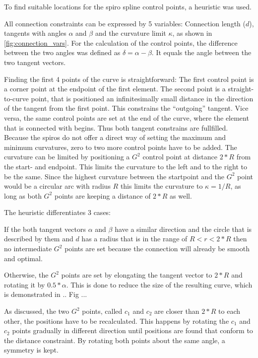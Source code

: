 To find suitable locations for the spiro spline control points, a heuristic was used.

All connection constraints can be expressed by 5 variables: Connection length ($d$), tangents with angles $\alpha$ and $\beta$ and the curvature limit $\kappa$, as shown in \autoref{fig:connection_vars}. For the calculation of the control points, the difference between the two angles was defined as $\delta = \alpha - \beta$. It equals the angle between the two tangent vectors. 

Finding the first 4 points of the curve is straightforward: The first control point is a corner point at the endpoint of the first element. The second point is a straight-to-curve point, that is positioned an infinitesimally small distance in the direction of the tangent from the first point. This constrains the \enquote{outgoing} tangent. Vice versa, the same control points are set at the end of the curve, where the element that is connected with begins. Thus both tangent constrains are fullfilled. Because the spiros do not offer a direct way of setting the maximum and minimum curvatures, zero to two more control points have to be added. The curvature can be limited by positioning a $G^2$ control point at distance $2 * R$ from the start- and endpoint. This limits the curvature to the left and to the right to be the same. Since the highest curvature between the startpoint and the $G^2$ point would be a circular arc with radius $R$ this limits the curvature to $\kappa = 1/R$, as long as both $G^2$ points are keeping a distance of $2*R$ as well.

The heuristic differentiates 3 cases:

If the both tangent vectors $\alpha$ and $\beta$ have a similar direction and the circle that is described by them and $d$ has a radius that is in the range of $R < r < 2*R$ then no intermediate $G^2$ points are set because the connection will already be smooth and optimal.

Otherwise, the $G^2$ points are set by elongating the tangent vector to $2*R$ and rotating it by $0.5 * \alpha$. This is done to reduce the size of the resulting curve, which is demonstrated in .. Fig ...

As discussed, the two $G^2$ points, called $c_1$ and $c_2$ are closer than $2 * R$ to each other, the positions have to be recalculated. This happens by rotating the $c_1$ and $c_2$ points gradually in different direction until positions are found that conform to the distance constraint. By rotating both points about the same angle, a symmetry is kept.

